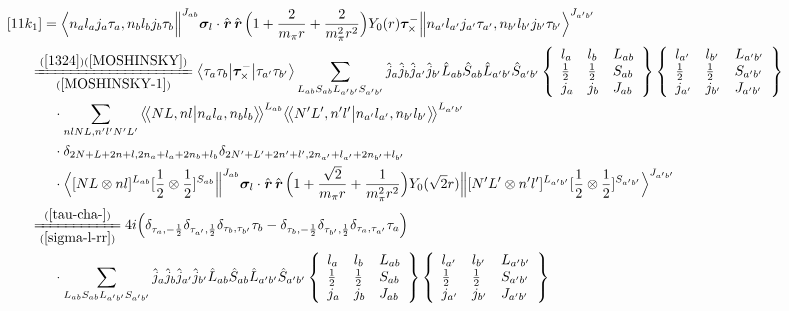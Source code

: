 \documentclass[master]{shnuthesis}
\newcommand{\llangle}{\big\langle\!\big\langle}
\newcommand{\rrangle}{\big\rangle\!\big\rangle}
\newcommand{\bmr}{\textbf{\textit{r}}}
\newcommand{\ap}{a^\prime}
\newcommand{\bp}{b^\prime}
\newcommand{\il}{\!\!\!\!\!\!\!\!\!\!}
\newcommand{\ii}{\!\!\!\!\!\!\!\!\!\!\!\!\!\!\!\!\!\!\!\!}
\newcommand{\zdydh}{\xlongequal}
\begin{document}
$$\begin{align}
    &\ii [11k_1] = \Big\langle n_a l_a j_a \tau_a, n_b l_b j_b \tau_b \Big\|^{J_{ab}} \bm{\sigma}_l\cdot\hat{\bmr}\,\hat{\bmr} \,\Big(1+\frac{2}{m_\pi r}+\frac{2}{m_\pi^2 r^2}\Big)Y_0(r)\bm{\tau}_\times^- \Big\| n_{\ap} l_{\ap} j_{\ap} \tau_{\ap}, n_{\bp} l_{\bp} j_{\bp} \tau_{\bp} \Big\rangle^{J_{\ap \bp}} \notag\\
    &\il \zdydh[(\ref{MOSHINSKY-1})]{(\ref{1324})(\ref{MOSHINSKY})} \big\langle \tau_a\tau_b \big|\bm{\tau}_\times^- \big|\tau_{\ap}\tau_{\bp}\big\rangle \sum_{L_{ab}S_{ab}L_{\ap\bp}S_{\ap\bp}} \hat{j}_a\hat{j}_b\hat{j}_{\ap}\hat{j}_{\bp}\hat{L}_{ab}\hat{S}_{ab}\hat{L}_{\ap\bp}\hat{S}_{\ap\bp}  \left\{\begin{array}{lll}l_{a} & l_{b} & L_{ab} \\ \frac{1}{2} & \frac{1}{2} & S_{ab} \\j_{a} & j_{b} & J_{ab} \end{array}\right\} \left\{\begin{array}{lll}l_{\ap} & l_{\bp} & L_{\ap\bp} \\ \frac{1}{2} & \frac{1}{2} & S_{\ap\bp} \\j_{\ap} & j_{\bp} & J_{\ap\bp} \end{array}\right\}  \notag \\
    & \cdot \sum_{nlNL,n^\prime l^\prime N^\prime L^\prime} \llangle N L, n l \big| n_{a} l_{a}, n_{b} l_{b} \rrangle^{L_{ab}} \llangle N^\prime L^\prime, n^\prime l^\prime \big| n_{a^\prime} l_{a^\prime}, n_{b^\prime} l_{b^\prime} \rrangle^{L_{\ap\bp}} \notag\\
    & \cdot \delta_{2N+L+2n+l,2n_a+l_a+2n_b+l_b}\delta_{2N^\prime+L^\prime+2n^\prime+l^\prime,2n_{a^\prime}+l_{a^\prime}+2n_{b^\prime}+l_{b^\prime}}  \notag\\
    & \cdot \Big\langle [N L \otimes n l]^{L_{ab}} [\frac{1}{2}\otimes\frac{1}{2}]^{S_{ab}} \Big\|^{J_{ab}} \bm{\sigma}_l\cdot\hat{\bmr}\,\hat{\bmr}\, \Big(1+\frac{\sqrt{2}}{m_\pi r}+\frac{1}{m_\pi^2 r^2}\Big) Y_0(\sqrt{2}r) \Big\| [N^\prime L^\prime \otimes n^\prime l^\prime]^{L_{\ap\bp}} [\frac{1}{2}\otimes\frac{1}{2}]^{S_{\ap\bp}} \Big\rangle^{J_{\ap \bp}} \\
    &\il \zdydh[(\ref{sigma-l-rr})]{(\ref{tau-cha-})} 4i \Big( \delta_{\tau_a,-\frac{1}{2}}\delta_{\tau_{\ap},\frac{1}{2}}\delta_{\tau_b,\tau_{\bp}}\tau_b - \delta_{\tau_b,-\frac{1}{2}}\delta_{\tau_{\bp},\frac{1}{2}}\delta_{\tau_a,\tau_{\ap}}\tau_a \Big) \notag\\
    & \cdot \sum_{L_{ab}S_{ab}L_{\ap\bp}S_{\ap\bp}} \hat{j}_a\hat{j}_b\hat{j}_{\ap}\hat{j}_{\bp}\hat{L}_{ab}\hat{S}_{ab}\hat{L}_{\ap\bp}\hat{S}_{\ap\bp}  \left\{\begin{array}{lll}l_{a} & l_{b} & L_{ab} \\ \frac{1}{2} & \frac{1}{2} & S_{ab} \\j_{a} & j_{b} & J_{ab} \end{array}\right\} \left\{\begin{array}{lll}l_{\ap} & l_{\bp} & L_{\ap\bp} \\ \frac{1}{2} & \frac{1}{2} & S_{\ap\bp} \\j_{\ap} & j_{\bp} & J_{\ap\bp} \end{array}\right\}  \notag \\

\end{align}$$
\end{document}
